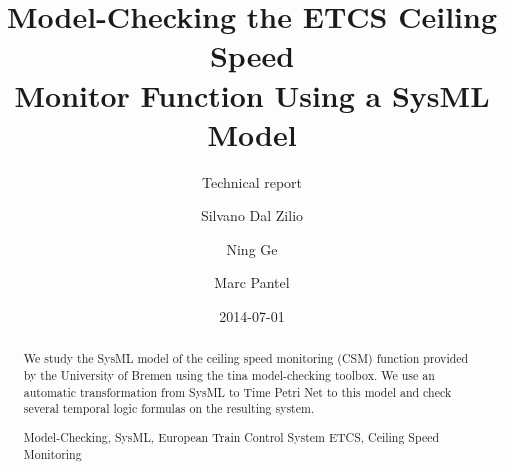 \documentclass{template/openetcs_article}
\newcommand{\keywords}[1]{\par\addvspace\baselineskip
\noindent {\bf Keywords} \enspace\ignorespaces#1}
\begin{document}
\frontmatter
{}




\title{Model-Checking the {ETCS} Ceiling Speed\\ Monitor Function Using
  a SysML Model}

\subtitle{Technical report}

\date{2014-07-01}


 

\author{Silvano Dal Zilio \and  Ning Ge}
\author{Marc Pantel}

 
\begin{abstract}
  We study the SysML model of the ceiling speed monitoring (CSM)
  function provided by the University of Bremen using the tina
  model-checking toolbox. We use an automatic transformation from
  SysML to Time Petri Net to this model and check several temporal
  logic formulas on the resulting system.

  \keywords{Model-Checking, SysML, European Train Control System ETCS,
    Ceiling Speed Monitoring}
\end{abstract}
 
\maketitle
\tableofcontents
\listoffiguresandtables
\newpage

\mainmatter



\newpage



\mainmatter  %
\end{document}
